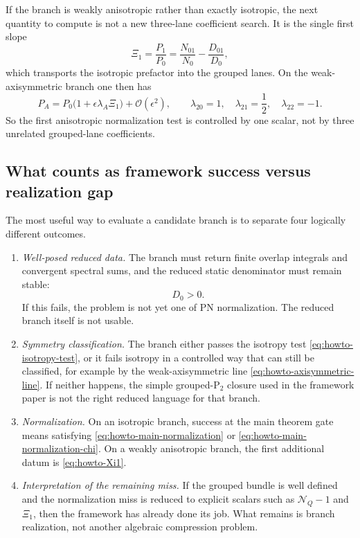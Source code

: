 \documentclass[11pt]{article}
\theoremstyle{definition}
\newcommand{\Ptwo}{\ensuremath{\mathrm{P}_2}}
\newcommand{\XiOne}{\ensuremath{\Xi_1}}
\newcommand{\cO}{\mathcal O}
\begin{document}
If the branch is weakly anisotropic rather than exactly isotropic, the next quantity to compute is not a new three-lane coefficient search. It is the single first slope
\begin{equation}
 \XiOne=\frac{P_1}{P_0}=\frac{N_{01}}{N_0}-\frac{D_{01}}{D_0},
 \label{eq:howto-Xi1}
\end{equation}
which transports the isotropic prefactor into the grouped lanes. On the weak-axisymmetric branch one then has
\begin{equation}
 P_A=P_0\bigl(1+\epsilon\lambda_A\XiOne\bigr)+\cO(\epsilon^2),
 \qquad
 \lambda_{20}=1,
 \quad
 \lambda_{21}=\frac12,
 \quad
 \lambda_{22}=-1.
 \label{eq:howto-PA-weakaxis}
\end{equation}
So the first anisotropic normalization test is controlled by one scalar, not by three unrelated grouped-lane coefficients.

\subsection{What counts as framework success versus realization gap}

The most useful way to evaluate a candidate branch is to separate four logically different outcomes.

\begin{enumerate}
    \item \emph{Well-posed reduced data.} The branch must return finite overlap integrals and convergent spectral sums, and the reduced static denominator must remain stable:
    \begin{equation}
     D_0>0.
     \label{eq:howto-stability}
    \end{equation}
    If this fails, the problem is not yet one of PN normalization. The reduced branch itself is not usable.

    \item \emph{Symmetry classification.} The branch either passes the isotropy test \eqref{eq:howto-isotropy-test}, or it fails isotropy in a controlled way that can still be classified, for example by the weak-axisymmetric line \eqref{eq:howto-axisymmetric-line}. If neither happens, the simple grouped-$\Ptwo$ closure used in the framework paper is not the right reduced language for that branch.

    \item \emph{Normalization.} On an isotropic branch, success at the main theorem gate means satisfying \eqref{eq:howto-main-normalization} or \eqref{eq:howto-main-normalization-chi}. On a weakly anisotropic branch, the first additional datum is \eqref{eq:howto-Xi1}.

    \item \emph{Interpretation of the remaining miss.} If the grouped bundle is well defined and the normalization miss is reduced to explicit scalars such as $\mathcal N_Q-1$ and $\XiOne$, then the framework has already done its job. What remains is branch realization, not another algebraic compression problem.
\end{enumerate}
\end{document}
